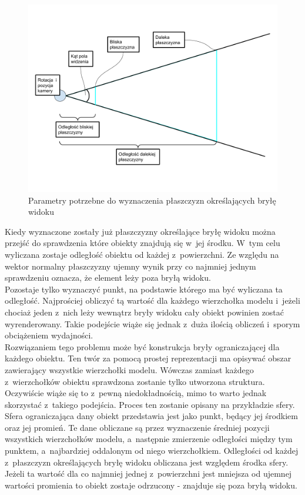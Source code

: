 \documentclass[a4paper,twoside,12pt]{book}
\begin{document}
\begin{figure}[H]
    \centering
    \includegraphics[width=\textwidth]{res/frustrum_geo_params.png}
    \caption{Parametry potrzebne do wyznaczenia płaszczyzn określających bryłę widoku}
    \label{fig:frustrum_geo_params}
\end{figure}

Kiedy wyznaczone zostały już płaszczyzny określające bryłę widoku można przejść do sprawdzenia które obiekty znajdują się w~jej środku. W~tym celu wyliczana zostaje odległość obiektu od każdej z~powierzchni. Ze względu na wektor normalny płaszczyzny ujemny wynik przy co najmniej jednym sprawdzeniu oznacza, że element leży poza bryłą widoku. \\
Pozostaje tylko wyznaczyć punkt, na podstawie którego ma być wyliczana ta odległość. Najprościej obliczyć tą wartość dla każdego wierzchołka modelu i~jeżeli chociaż jeden z~nich leży wewnątrz bryły widoku cały obiekt powinien zostać wyrenderowany. Takie podejście wiąże się jednak z~duża ilością obliczeń i~sporym obciążeniem wydajności.  \\
Rozwiązaniem tego problemu może być konstrukcja bryły ograniczającej dla każdego obiektu. Ten twór za pomocą prostej reprezentacji ma opisywać obszar zawierający wszystkie wierzchołki modelu. Wówczas zamiast każdego z~wierzchołków obiektu sprawdzona zostanie tylko utworzona struktura. Oczywiście wiąże się to z~pewną niedokładnością, mimo to warto jednak skorzystać z~takiego podejścia. Proces ten zostanie opisany na przykładzie sfery. \\
Sfera ograniczająca dany obiekt przedstawia jest jako punkt, będący jej środkiem oraz jej promień. Te dane obliczane są przez wyznaczenie średniej pozycji wszystkich wierzchołków modelu, a~następnie zmierzenie odległości między tym punktem, a~najbardziej oddalonym od niego wierzchołkiem. Odległości od każdej z~płaszczyzn określających bryłę widoku obliczana jest względem środka sfery. Jeżeli ta wartość dla co najmniej jednej z~powierzchni jest mniejsza od ujemnej wartości promienia to obiekt zostaje odrzucony - znajduje się poza bryłą widoku.
\end{document}
